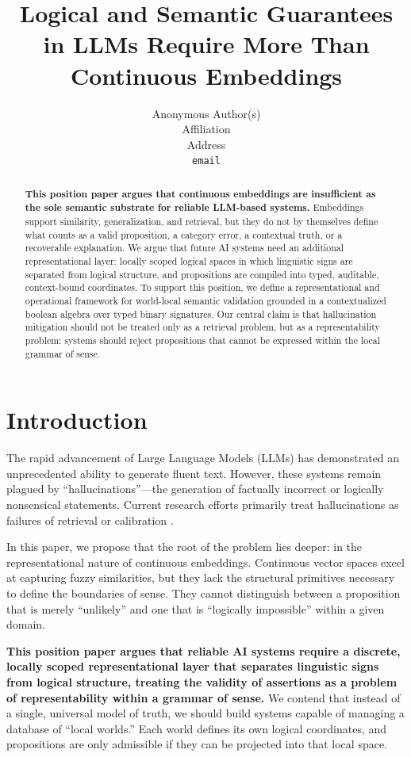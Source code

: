\documentclass{article}
\title{Logical and Semantic Guarantees in LLMs Require More Than Continuous Embeddings}
\author{%
  Anonymous Author(s) \\
  Affiliation \\
  Address \\
  \texttt{email} \\
}
\begin{document}
\maketitle

\begin{abstract}
  \textbf{This position paper argues that continuous embeddings are insufficient as the sole semantic substrate for reliable LLM-based systems.} Embeddings support similarity, generalization, and retrieval, but they do not by themselves define what counts as a valid proposition, a category error, a contextual truth, or a recoverable explanation. We argue that future AI systems need an additional representational layer: locally scoped logical spaces in which linguistic signs are separated from logical structure, and propositions are compiled into typed, auditable, context-bound coordinates. To support this position, we define a representational and operational framework for world-local semantic validation grounded in a contextualized boolean algebra over typed binary signatures. Our central claim is that hallucination mitigation should not be treated only as a retrieval problem, but as a representability problem: systems should reject propositions that cannot be expressed within the local grammar of sense.
\end{abstract}

\section{Introduction}

The rapid advancement of Large Language Models (LLMs) has demonstrated an unprecedented ability to generate fluent text. However, these systems remain plagued by ``hallucinations''---the generation of factually incorrect or logically nonsensical statements. Current research efforts primarily treat hallucinations as failures of retrieval \citep{factscore2023} or calibration \citep{semantic_entropy2024}.

In this paper, we propose that the root of the problem lies deeper: in the representational nature of continuous embeddings. Continuous vector spaces excel at capturing fuzzy similarities, but they lack the structural primitives necessary to define the boundaries of sense. They cannot distinguish between a proposition that is merely ``unlikely'' and one that is ``logically impossible'' within a given domain.

\textbf{This position paper argues that reliable AI systems require a discrete, locally scoped representational layer that separates linguistic signs from logical structure, treating the validity of assertions as a problem of representability within a grammar of sense.} We contend that instead of a single, universal model of truth, we should build systems capable of managing a database of ``local worlds.'' Each world defines its own logical coordinates, and propositions are only admissible if they can be projected into that local space.
\end{document}

